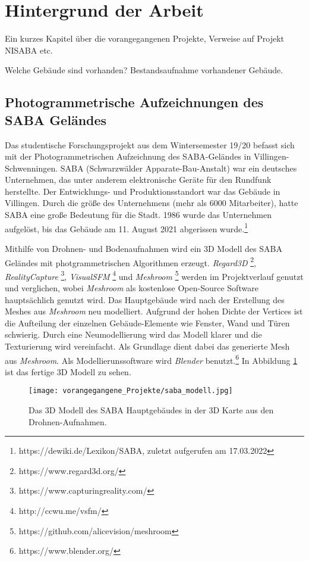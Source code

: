 \section{Hintergrund der Arbeit}
Ein kurzes Kapitel über die vorangegangenen Projekte, Verweise auf Projekt NISABA etc.

Welche Gebäude sind vorhanden? Bestandsaufnahme vorhandener Gebäude.

\subsection{Photogrammetrische Aufzeichnungen des SABA Geländes}
Das studentische Forschungsprojekt aus dem Wintersemester 19/20 \cite{reich2020} befasst sich mit  der Photogrammetrischen Aufzeichnung des SABA-Geländes in Villingen-Schwenningen. SABA (Schwarzwälder Apparate-Bau-Anstalt) war ein deutsches Unternehmen, das unter anderem elektronische Geräte für den Rundfunk herstellte. Der Entwicklungs- und Produktionsstandort war das Gebäude in Villingen. Durch die größe des Unternehmens (mehr als 6000 Mitarbeiter), hatte SABA eine große Bedeutung für die Stadt. 1986 wurde das Unternehmen aufgelöst, bis das Gebäude am 11. August 2021 abgerissen wurde.\footnote{https://dewiki.de/Lexikon/SABA, zuletzt aufgerufen am 17.03.2022} 

Mithilfe von Drohnen- und Bodenaufnahmen wird ein 3D Modell des SABA Geländes mit photgrammetrischen Algorithmen erzeugt. \textit{Regard3D} \footnote{https://www.regard3d.org/}, \textit{RealityCapture} \footnote{https://www.capturingreality.com/}, \textit{VisualSFM} \footnote{http://ccwu.me/vsfm/} und \textit{Meshroom} \footnote{https://github.com/alicevision/meshroom} werden im Projektverlauf genutzt und verglichen, wobei \textit{Meshroom} als kostenlose Open-Source Software hauptsächlich genutzt wird. Das Hauptgebäude wird nach der Erstellung des Meshes aus \textit{Meshroom} neu modelliert. Aufgrund der hohen Dichte der Vertices ist die Aufteilung der einzelnen Gebäude-Elemente wie Fenster, Wand und Türen schwierig. Durch eine Neumodellierung wird das Modell klarer und die Texturierung wird vereinfacht. Als Grundlage dient dabei das generierte Mesh aus \textit{Meshroom}. Als Modellierunssoftware wird \textit{Blender} benutzt.\footnote{https://www.blender.org/} In Abbildung \ref{fig:SABA3DModell} ist das fertige 3D Modell zu sehen.

\begin{figure}[h]
    \centering
    \texttt{[image: vorangegangene\_Projekte/saba\_modell.jpg]}
    \caption{Das 3D Modell des SABA Hauptgebäudes in der 3D Karte aus den Drohnen-Aufnahmen.}
    \label{fig:SABA3DModell}
\end{figure}

